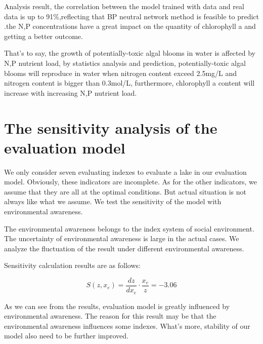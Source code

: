 \documentclass[12pt,a4paper]{article}
\begin{document}
Analysis result, the correlation between the model trained with data and real data is up to 91\%,reflecting that BP neutral network method is feasible to predict .the N,P concentrations have a great impact on the quantity of chlorophyll a and getting a better outcome.\par

That's to say, the growth of potentially-toxic algal blooms in water is affected by N,P nutrient load, by statistics analysis and prediction, potentially-toxic algal blooms will reproduce in water when nitrogen content exceed 2.5mg/L and nitrogen content is bigger than 0.3mol/L, furthermore, chlorophyll a content will increase with increasing N,P nutrient load.\par 

\section{The sensitivity analysis of the evaluation model}
We only consider seven evaluating indexes to evaluate a lake in our evaluation model. Obviously, these indicators are incomplete. As for the other indicators, we assume that they are all at the optimal conditions. But actual situation is not always like what we assume. We test the sensitivity of the model with environmental awareness.\par
The environmental awareness belongs to the index system of social environment. The uncertainty of environmental awareness is large in the actual cases. We analyze the fluctuation of the result under different environmental awareness.\par
Sensitivity calculation results are as follows:

\begin{equation}
S(z,x_e)=\frac{dz}{dx_{e}}\cdot\frac{x_e}{z}=-3.06
\end{equation}

As we can see from the results, evaluation model is greatly influenced by environmental awareness. The reason for this result may be that the environmental awareness influences some indexes. What's more, stability of our model also need to be further improved.\par
\end{document}
